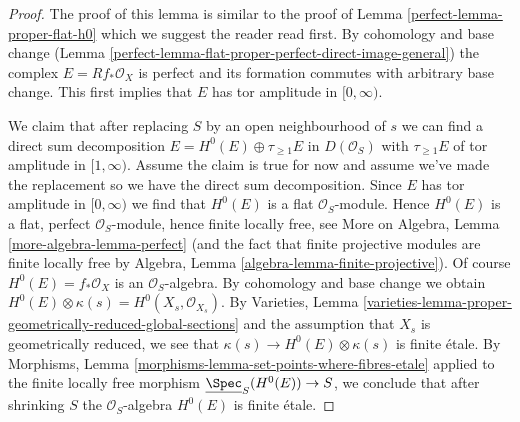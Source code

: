 \begin{proof}

The proof of this lemma is similar to the proof of
Lemma \ref{perfect-lemma-proper-flat-h0}
which we suggest the reader read first.
By cohomology and base change
(Lemma \ref{perfect-lemma-flat-proper-perfect-direct-image-general})
the complex $E = Rf_*\mathcal{O}_X$
is perfect and its formation commutes with arbitrary base change.
This first implies that $E$ has tor amplitude in $[0, \infty)$.

\medskip\noindent
We claim that after replacing $S$ by an open neighbourhood of
$s$ we can find a direct sum decomposition
$E = H^0(E) \oplus \tau_{\geq 1}E$ in $D(\mathcal{O}_S)$
with $\tau_{\geq 1}E$ of tor amplitude in $[1, \infty)$.
Assume the claim is true for now and assume we've made the replacement
so we have the direct sum decomposition.
Since $E$ has tor amplitude in $[0, \infty)$ we find that
$H^0(E)$ is a flat $\mathcal{O}_S$-module.
Hence $H^0(E)$ is a flat, perfect $\mathcal{O}_S$-module,
hence finite locally free, see
More on Algebra, Lemma \ref{more-algebra-lemma-perfect}
(and the fact that finite projective modules are finite locally free by
Algebra, Lemma \ref{algebra-lemma-finite-projective}).
Of course $H^0(E) = f_*\mathcal{O}_X$ is an $\mathcal{O}_S$-algebra.
By cohomology and base change we obtain
$H^0(E) \otimes \kappa(s) = H^0(X_s, \mathcal{O}_{X_s})$.
By Varieties, Lemma
\ref{varieties-lemma-proper-geometrically-reduced-global-sections}
and the assumption that $X_s$ is geometrically reduced, we
see that $\kappa(s) \to H^0(E) \otimes \kappa(s)$
is finite \'etale. By Morphisms, Lemma
\ref{morphisms-lemma-set-points-where-fibres-etale}
applied to the finite locally free morphism
$\underline{\Spec}_S(H^0(E)) \to S$,
we conclude that after shrinking $S$ the $\mathcal{O}_S$-algebra
$H^0(E)$ is finite \'etale.


\end{proof}
